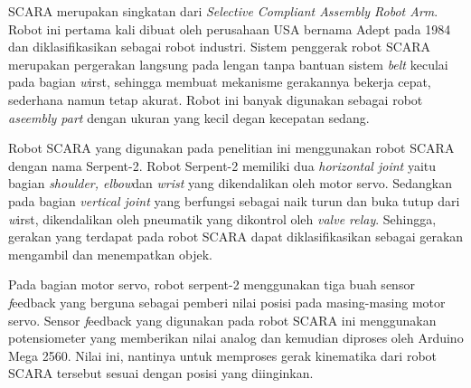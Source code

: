 SCARA merupakan singkatan dari \emph{Selective Compliant Assembly Robot Arm}. Robot ini pertama kali dibuat oleh perusahaan USA bernama Adept pada 1984 dan diklasifikasikan sebagai robot industri. Sistem penggerak robot SCARA merupakan pergerakan langsung pada lengan tanpa bantuan sistem \emph{belt} keculai pada bagian \emph wirst, sehingga membuat mekanisme gerakannya bekerja cepat, sederhana namun tetap akurat. Robot ini banyak digunakan sebagai robot \emph {aseembly part} dengan ukuran yang kecil degan kecepatan sedang. 


Robot SCARA yang digunakan pada penelitian ini menggunakan robot SCARA dengan nama Serpent-2. Robot Serpent-2 memiliki dua \textit{horizontal joint} yaitu bagian \textit{shoulder, elbow}dan \textit{wrist} yang dikendalikan oleh motor servo. Sedangkan pada bagian \textit{vertical joint} yang berfungsi sebagai naik turun dan buka tutup dari \emph wirst, dikendalikan oleh pneumatik yang dikontrol oleh \emph {valve relay}. Sehingga, gerakan yang terdapat pada robot SCARA dapat diklasifikasikan sebagai gerakan mengambil dan menempatkan objek. 


\begin{table}[H]
	\centering
	\caption{Spesifikasi Robot Serpent-2}
		\end{table}
		
		Pada bagian motor servo, robot serpent-2 menggunakan tiga buah sensor \emph feedback yang berguna sebagai pemberi nilai posisi pada masing-masing motor servo. Sensor \emph feedback yang digunakan pada robot SCARA ini menggunakan potensiometer yang memberikan nilai analog dan kemudian diproses oleh Arduino Mega 2560. Nilai ini, nantinya untuk memproses gerak kinematika dari robot SCARA tersebut sesuai dengan posisi yang diinginkan.



